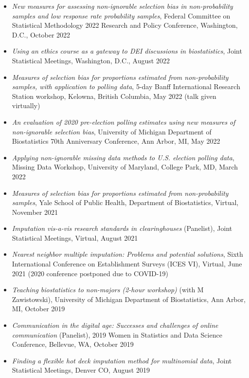 \documentclass[
  english,
  letterpaper,
  DIV=11,
  numbers=noendperiod]{scrartcl}
\begin{document}
\begin{itemize}
  Census Bureau's Economic Area Methodology Seminar, Virtual, September
  2022
\item
  \emph{New measures for assessing non-ignorable selection bias in
  non-probability samples and low response rate probability samples},
  Federal Committee on Statistical Methodology 2022 Research and Policy
  Conference, Washington, D.C., October 2022
\item
  \emph{Using an ethics course as a gateway to DEI discussions in
  biostatistics}, Joint Statistical Meetings, Washington, D.C., August
  2022
\item
  \emph{Measures of selection bias for proportions estimated from
  non-probability samples, with application to polling data}, 5-day
  Banff International Research Station workshop, Kelowna, British
  Columbia, May 2022 (talk given virtually)
\item
  \emph{An evaluation of 2020 pre-election polling estimates using new
  measures of non-ignorable selection bias}, University of Michigan
  Department of Biostatistics 70th Anniversary Conference, Ann Arbor,
  MI, May 2022
\item
  \emph{Applying non-ignorable missing data methods to U.S. election
  polling data}, Missing Data Workshop, University of Maryland, College
  Park, MD, March 2022
\item
  \emph{Measures of selection bias for proportions estimated from
  non-probability samples}, Yale School of Public Health, Department of
  Biostatistics, Virtual, November 2021
\item
  \emph{Imputation vis-a-vis research standards in clearinghouses}
  (Panelist), Joint Statistical Meetings, Virtual, August 2021
\item
  \emph{Nearest neighbor multiple imputation: Problems and potential
  solutions}, Sixth International Conference on Establishment Surveys
  (ICES VI), Virtual, June 2021 (2020 conference postponed due to
  COVID-19)
\item
  \emph{Teaching biostatistics to non-majors (2-hour workshop)} (with M
  Zawistowski), University of Michigan Department of Biostatistics, Ann
  Arbor, MI, October 2019
\item
  \emph{Communication in the digital age: Successes and challenges of
  online communication} (Panelist), 2019 Women in Statistics and Data
  Science Conference, Bellevue, WA, October 2019
\item
  \emph{Finding a flexible hot deck imputation method for multinomial
  data}, Joint Statistical Meetings, Denver CO, August 2019

\end{itemize}
\end{document}
